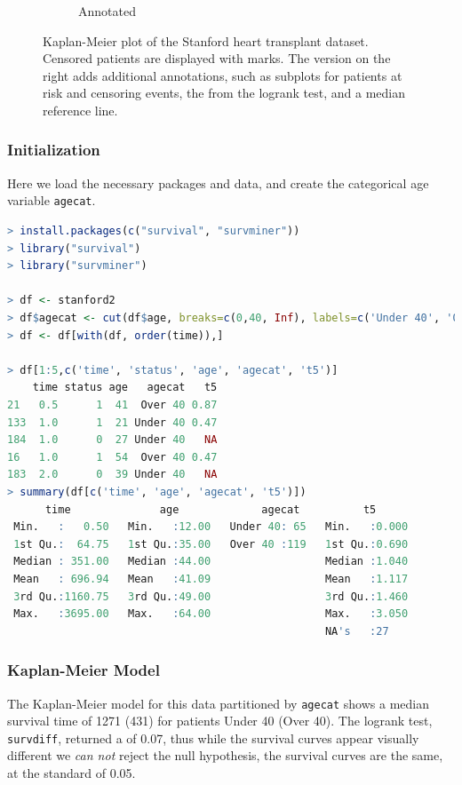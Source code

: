 \begin{figure}[H]
\begin{subfigure}[c]{0.48\textwidth}
  \caption{Annotated}
  \label{fig:stanford_km:annotated}
  \end{subfigure}
\caption{
Kaplan-Meier plot of the Stanford heart transplant dataset. Censored patients are displayed with marks.
The version on the right adds additional annotations, such as
subplots for patients at risk and censoring events,
the \pvalue from the logrank test, and a median reference line.
}
\label{fig:stanford_km}
\end{figure}

\subsubsection{Initialization}
\label{additional:Survival:Rcode:init}

Here we load the necessary packages and data,
and create the categorical age variable \texttt{agecat}.

\begin{lstlisting}[language=R]
> install.packages(c("survival", "survminer"))
> library("survival")
> library("survminer")

> df <- stanford2
> df$agecat <- cut(df$age, breaks=c(0,40, Inf), labels=c('Under 40', 'Over 40'), right=FALSE)
> df <- df[with(df, order(time)),]

> df[1:5,c('time', 'status', 'age', 'agecat', 't5')]
    time status age   agecat   t5
21   0.5      1  41  Over 40 0.87
133  1.0      1  21 Under 40 0.47
184  1.0      0  27 Under 40   NA
16   1.0      1  54  Over 40 0.47
183  2.0      0  39 Under 40   NA
> summary(df[c('time', 'age', 'agecat', 't5')])
      time              age             agecat          t5
 Min.   :   0.50   Min.   :12.00   Under 40: 65   Min.   :0.000
 1st Qu.:  64.75   1st Qu.:35.00   Over 40 :119   1st Qu.:0.690
 Median : 351.00   Median :44.00                  Median :1.040
 Mean   : 696.94   Mean   :41.09                  Mean   :1.117
 3rd Qu.:1160.75   3rd Qu.:49.00                  3rd Qu.:1.460
 Max.   :3695.00   Max.   :64.00                  Max.   :3.050
                                                  NA's   :27
\end{lstlisting}

\subsubsection{Kaplan-Meier Model}
\label{additional:Survival:Rcode:km}

The Kaplan-Meier model for this data partitioned by \texttt{agecat}
shows a median survival time of \num{1271} (\num{431}) for patients Under 40 (Over 40).
The logrank test, \texttt{survdiff}, returned a \pvalue of \num{0.07},
thus while the survival curves appear visually different we {\em can not} reject the null hypothesis,
the survival curves are the same, at the standard \pvalue of \num{0.05}.


